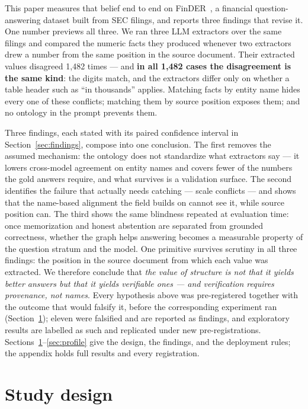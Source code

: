 \documentclass{article}
\begin{document}
This paper measures that belief end to end on FinDER~\citep{finder}, a
financial question-answering dataset built from SEC filings, and reports
three findings that revise it. One number previews all three. We ran
three LLM extractors over the same filings and compared the numeric facts
they produced whenever two extractors drew a number from the same position
in the source document. Their extracted values disagreed 1,482 times
--- and \textbf{in all 1,482 cases the disagreement is the same kind}: the
digits match, and the extractors differ only on whether a table header
such as ``in thousands'' applies. Matching facts by entity name hides
every one of these conflicts; matching them by source position exposes
them; and no ontology in the prompt prevents them.

Three findings, each stated with its paired confidence interval in
Section~\ref{sec:findings}, compose into one conclusion. The first
removes the assumed mechanism: the ontology does not standardize what
extractors say --- it lowers cross-model agreement on entity names and
covers fewer of the numbers the gold answers require, and what survives
is a validation surface. The second identifies the failure that actually
needs catching --- scale conflicts --- and shows that the name-based
alignment the field builds on cannot see it, while source position can.
The third shows the same blindness repeated at evaluation time: once
memorization and honest abstention are separated from grounded
correctness, whether the graph helps answering becomes a measurable
property of the question stratum and the model. One primitive
survives scrutiny in all three findings: the position in the source
document from which each value was extracted. We therefore conclude that \emph{the value of structure is
not that it yields better answers but that it yields verifiable ones ---
and verification requires provenance, not names}. Every hypothesis above
was pre-registered together with the outcome that would falsify it, before
the corresponding experiment ran (Section~\ref{sec:stack}); eleven were
falsified and are reported as findings, and exploratory results are
labelled as such and replicated under new pre-registrations.
Sections~\ref{sec:stack}--\ref{sec:profile} give the design, the
findings, and the deployment rules; the appendix holds full results and
every registration.


\section{Study design}\label{sec:stack}
\end{document}
